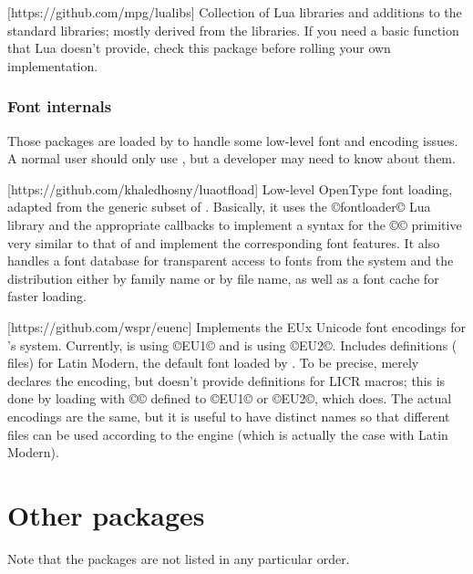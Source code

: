 \documentclass{lltxdoc}
\begin{document}
[https://github.com/mpg/lualibs]
Collection of Lua libraries and additions to the standard libraries; mostly
derived from the \context libraries. If you need a basic function that Lua
doesn't provide, check this package before rolling your own implementation.

\subsubsection{Font internals}\label{fontint}

Those packages are loaded by  to handle some low-level font and
encoding issues. A normal user should only use , but a developer
may need to know about them.

[https://github.com/khaledhosny/luaotfload]
Low-level OpenType font loading, adapted from the generic subset of \context.
Basically, it uses the ©fontloader© Lua library and the appropriate callbacks
to implement a syntax for the ©\font© primitive very similar to that of \xetex
and implement the corresponding font features. It also handles a font database
for transparent access to fonts from the system and the \tex distribution
either by family name or by file name, as well as a font cache for faster
loading.

[https://github.com/wspr/euenc]
Implements the EUx Unicode font encodings for \latex's  system.
Currently, \xelatex is using ©EU1© and \luatex is using ©EU2©. Includes
definitions ( files) for Latin Modern, the default font loaded by
. To be precise,  merely declares the encoding, but
doesn't provide definitions for LICR macros; this is done by loading
 with ©\UTFencname© defined to ©EU1© or ©EU2©, which
 does. The actual encodings are the same, but it is useful to
have distinct names so that different  files can be used according to
the engine (which is actually the case with Latin Modern).


\section{Other packages}\label{other}

Note that the packages are not listed in any particular order.
\end{document}

